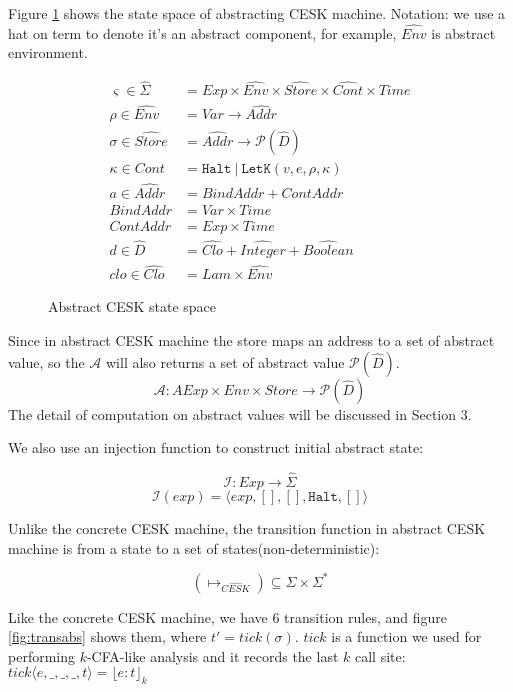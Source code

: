 \documentclass[paper=a4, fontsize=11pt]{scrartcl} %
\numberwithin{equation}{section} %
\numberwithin{figure}{section} %
\numberwithin{table}{section} %
\begin{document}
Figure \ref{fig:abstractcesk} shows the state space of abstracting CESK machine. Notation: we use a hat on term to denote it's an abstract component, for example, $\widehat{Env}$ is abstract environment.

\begin{figure}[h!]
\begin{align*}
\varsigma \in \widehat{\Sigma} & = Exp \times \widehat{Env} \times \widehat{Store} \times \widehat{Cont} \times Time \\
\rho \in \widehat{Env} & = Var \rightarrow \widehat{Addr} \\
\sigma \in \widehat{Store} & = \widehat{Addr} \rightarrow \mathcal{P}(\hat{D}) \\
\kappa \in Cont & = \texttt{Halt} ~|~ \texttt{LetK}(v,e,\rho,\kappa) \\
a \in \widehat{Addr} & = BindAddr + ContAddr \\
BindAddr &= Var \times Time \\
ContAddr &= Exp \times Time \\
d \in \hat{D} & = \widehat{Clo} + \widehat{Integer} + \widehat{Boolean} \\
clo \in \widehat{Clo} & = Lam \times \widehat{Env}
\end{align*}
\caption{Abstract CESK state space}
\label{fig:abstractcesk}
\end{figure}

Since in abstract CESK machine the store maps an address to a set of abstract value, so the $\mathcal{A}$ will also returns a set of abstract value $\mathcal{P}(\hat{D})$. 
$$ \mathcal{A} : AExp \times Env \times Store \rightarrow \mathcal{P}(\hat{D}) $$
The detail of computation on abstract values will be discussed in Section 3.

We also use an injection function to construct initial abstract state:

$$ \mathcal{I} : Exp \rightarrow \widehat{\Sigma} $$
$$ \mathcal{I}(exp) = \langle exp, [], [], \texttt{Halt}, [] \rangle $$

Unlike the concrete CESK machine, the transition function in abstract CESK machine is from a state to a set of states(non-deterministic):

$$(\longmapsto_{\widehat{CESK}}) \subseteq \Sigma \times \Sigma^{*}$$

Like the concrete CESK machine, we have 6 transition rules, and figure \ref{fig:transabs} shows them, where $t' = tick(\sigma)$. $tick$ is a function we used for performing $k$-CFA-like analysis and it records the last $k$ call site: $tick \langle e, \_, \_, \_, t \rangle = {\lfloor e : t \rfloor}_{k} $
\end{document}
